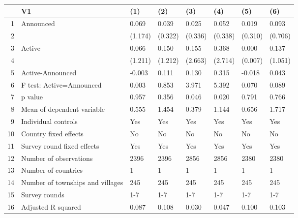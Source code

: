 \begin{table}[ht]
\centering
\begin{tabular}{rlllllll}
  \hline
 & V1 & (1) & (2) & (3) & (4) & (5) & (6) \\ 
  \hline
1 & Announced & 0.069 & 0.039 & 0.025 & 0.052 & 0.019 & 0.093 \\ 
  2 &  & (1.174) & (0.322) & (0.336) & (0.338) & (0.310) & (0.706) \\ 
  3 & Active & 0.066 & 0.150 & 0.155 & 0.368 & 0.000 & 0.137 \\ 
  4 &  & (1.211) & (1.212) & (2.663) & (2.714) & (0.007) & (1.051) \\ 
  5 & Active-Announced & -0.003 & 0.111 & 0.130 & 0.315 & -0.018 & 0.043 \\ 
  6 & F test: Active=Announced & 0.003 & 0.853 & 3.971 & 5.392 & 0.070 & 0.089 \\ 
  7 & p value & 0.957 & 0.356 & 0.046 & 0.020 & 0.791 & 0.766 \\ 
  8 & Mean of dependent variable & 0.555 & 1.454 & 0.379 & 1.144 & 0.656 & 1.717 \\ 
  9 & Individual controls & Yes & Yes & Yes & Yes & Yes & Yes \\ 
  10 & Country fixed effects & No & No & No & No & No & No \\ 
  11 & Survey round fixed effects & Yes & Yes & Yes & Yes & Yes & Yes \\ 
  12 & Number of observations & 2396 & 2396 & 2856 & 2856 & 2380 & 2380 \\ 
  13 & Number of countries & 1 & 1 & 1 & 1 & 1 & 1 \\ 
  14 & Number of townships and villages & 245 & 245 & 245 & 245 & 245 & 245 \\ 
  15 & Survey rounds & 1-7 & 1-7 & 1-7 & 1-7 & 1-7 & 1-7 \\ 
  16 & Adjusted R squared & 0.087 & 0.108 & 0.030 & 0.047 & 0.100 & 0.103 \\ 
   \hline
\end{tabular}
\end{table}
